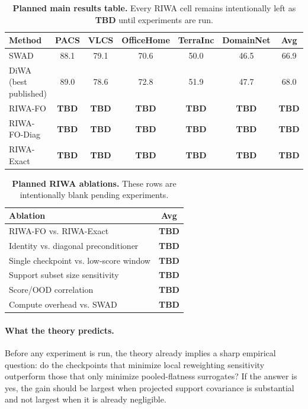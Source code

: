 \documentclass{article}
\newcommand{\TBD}{\textbf{TBD}}
\newcommand{\ood}{OOD}
\newcommand{\riwa}{\textup{\textsc{RIWA}}}
\newcommand{\swad}{\textup{\textsc{SWAD}}}
\begin{document}
\begin{table}[t]
    \centering
    \small
    \caption{\textbf{Planned main results table.} Every \riwa{} cell remains intentionally left as \TBD{} until experiments are run.}
    \label{tab:main_tbd}
    \begin{tabular}{lcccccc}
        \toprule
        Method & PACS & VLCS & OfficeHome & TerraInc & DomainNet & Avg \\
        \midrule
        \swad{} & 88.1 & 79.1 & 70.6 & 50.0 & 46.5 & 66.9 \\
        DiWA (best published) & 89.0 & 78.6 & 72.8 & 51.9 & 47.7 & 68.0 \\
        \riwa-FO & \TBD & \TBD & \TBD & \TBD & \TBD & \TBD \\
        \riwa-FO-Diag & \TBD & \TBD & \TBD & \TBD & \TBD & \TBD \\
        \riwa-Exact & \TBD & \TBD & \TBD & \TBD & \TBD & \TBD \\
        \bottomrule
    \end{tabular}
\end{table}

\begin{table}[t]
    \centering
    \small
    \caption{\textbf{Planned \riwa{} ablations.} These rows are intentionally blank pending experiments.}
    \label{tab:ablations}
    \begin{tabular}{lc}
        \toprule
        Ablation & Avg \\
        \midrule
        \riwa-FO vs. \riwa-Exact & \TBD \\
        Identity vs. diagonal preconditioner & \TBD \\
        Single checkpoint vs. low-score window & \TBD \\
        Support subset size sensitivity & \TBD \\
        Score/\ood{} correlation & \TBD \\
        Compute overhead vs. \swad{} & \TBD \\
        \bottomrule
    \end{tabular}
\end{table}

\paragraph{What the theory predicts.}
Before any experiment is run, the theory already implies a sharp empirical question: do the checkpoints that minimize local reweighting sensitivity outperform those that only minimize pooled-flatness surrogates? If the answer is yes, the gain should be largest when projected support covariance is substantial and not largest when it is already negligible.
\end{document}
